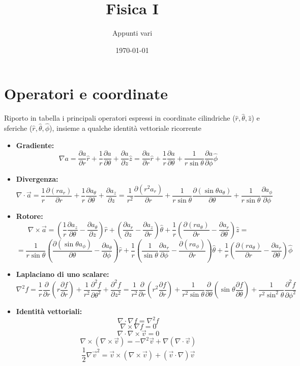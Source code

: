 \documentclass[a4paper,11pt]{article}
\title{Fisica I}
\author{Appunti vari}
\date{\today}
\begin{document}
	
	\maketitle
	\tableofcontents
	\newpage
\section{Operatori e coordinate}
Riporto in tabella i principali operatori espressi in coordinate cilindriche ($\hat{r},\hat{\theta},\hat{z}$) e sferiche ($\hat{r},\hat{\theta},\hat{\phi}$), insieme a qualche identità vettoriale ricorrente

\begin{itemize}
	\item\textbf{Gradiente: } \[\nabla a=\frac{\partial a}{\partial r}\hat{r}+\frac{1}{r}\frac{\partial a}{\partial \theta}+\frac{\partial a}{\partial z}\hat{z}=\frac{\partial a}{\partial r}\hat{r}+\frac{1}{r}\frac{\partial a}{\partial \theta}+\frac{1}{r\sin\theta}\frac{\partial a}{\partial \phi}\hat{\phi}\]
	\item\textbf{Divergenza: } \[\nabla\cdot\vec{a}=\frac{1}{r}\frac{\partial(ra_r)}{\partial r}+\frac{1}{r}\frac{\partial a_\theta}{\partial \theta}+\frac{\partial a_z}{\partial z}=\frac{1}{r^2}\frac{\partial(r^2a_r)}{\partial r}+\frac{1}{r\sin\theta}\frac{\partial(\sin\theta a_\theta)}{\partial \theta}+\frac{1}{r\sin\theta}\frac{\partial a_\phi}{\partial \phi}\]
	\item\textbf{Rotore: } \[\nabla\times\vec{a}=\left(\frac{1}{r}\frac{\partial a_z}{\partial \theta}-\frac{\partial a_\theta}{\partial z}\right)\hat{r}+\left(\frac{\partial a_r}{\partial z}-\frac{\partial a_z}{\partial r}\right)\hat{\theta}+\frac{1}{r}\left(\frac{\partial\left(ra_\theta\right)}{\partial r}-\frac{\partial a_r}{\partial \theta}\right)\hat{z}=\]
	\[=\frac{1}{r\sin\theta}\left(\frac{\partial\left(\sin\theta a_\phi\right)}{\partial\theta}-\frac{\partial a_\theta}{\partial \phi}\right)\hat{r}+\frac{1}{r}\left(\frac{1}{\sin\theta}\frac{\partial a_r}{\partial \phi}-\frac{\partial\left(ra_\phi\right)}{\partial r}\right)\hat{\theta}+\frac{1}{r}\left(\frac{\partial\left(r a_\theta\right)}{\partial r}-\frac{\partial a_r}{\partial \theta}\right)\hat{\phi}\]
	\item\textbf{Laplaciano di uno scalare: }
	\[\nabla^2 f=\frac{1}{r}\frac{\partial}{\partial r}\left(r\frac{\partial f}{\partial r}\right)+\frac{1}{r^2}\frac{\partial^2 f}{\partial\theta^2}+\frac{\partial^2f}{\partial z^2}=\frac{1}{r^2}\frac{\partial}{\partial r}\left(r^2\frac{\partial f}{\partial r}\right)+\frac{1}{r^2\sin\theta}\frac{\partial}{\partial \theta}\left(\sin\theta\frac{\partial f}{\partial \theta}\right)+\frac{1}{r^2\sin^2\theta}\frac{\partial^2f}{\partial\phi^2}\]	
	\item\textbf{Identità vettoriali: }
	\[\nabla\cdot\nabla f=\nabla^2f\]
	\[\nabla\times\nabla f=0\]
	\[\nabla\cdot\nabla\times\vec{v}=0\]
	\[\nabla\times(\nabla\times\vec{v})=-\nabla^2\vec{v}+\nabla(\nabla\cdot\vec{v})\]
	\[\frac{1}{2}\nabla\vec{v}^2=\vec{v}\times(\nabla\times\vec{v})+(\vec{v}\cdot\nabla)\vec{v}\]
\end{itemize}
\end{document}
